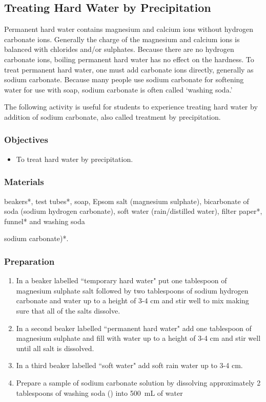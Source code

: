 {\subsection{Treating Hard Water by Precipitation}

Permanent hard water contains magnesium and calcium ions without hydrogen carbonate ions. Generally the charge of the magnesium and calcium ions is balanced with chlorides and/or sulphates. Because there are no hydrogen carbonate ions, boiling permanent hard water has no effect on the hardness. To treat permanent hard water, one must add carbonate ions directly, generally as sodium carbonate. Because many people use sodium carbonate for softening water for use with soap, sodium carbonate is often called `washing soda.'

The following activity is useful for students to experience treating hard water by addition of sodium carbonate, also called treatment by precipitation.

\subsubsection*{Objectives}
\begin{itemize}
\item{To treat hard water by precipitation.}
\end{itemize}

\subsubsection*{Materials}
beakers*, test tubes*, soap, Epsom salt (magnesium sulphate), bicarbonate of soda (sodium hydrogen carbonate), soft water (rain/distilled water), filter paper*, funnel* and washing soda {sodium carbonate)*.

\subsubsection*{Preparation}
\begin{enumerate}
\item{In a beaker labelled ``temporary hard water" put one tablespoon of magnesium sulphate salt followed by two tablespoons  of sodium hydrogen carbonate and water up to a height of 3-4 cm and stir well to mix making sure that all of the salts dissolve.}
\item{In a second beaker labelled ``permanent hard water" add one tablespoon of magnesium sulphate and fill with water up to a height of 3-4 cm and stir well until all salt is dissolved.}
\item{In a third beaker labelled ``soft water"  add soft rain water up to 3-4 cm.}
\item{Prepare a sample of sodium carbonate solution by dissolving approximately 2 tablespoons of washing soda () into 500~mL of water}
\end{enumerate}

}}
